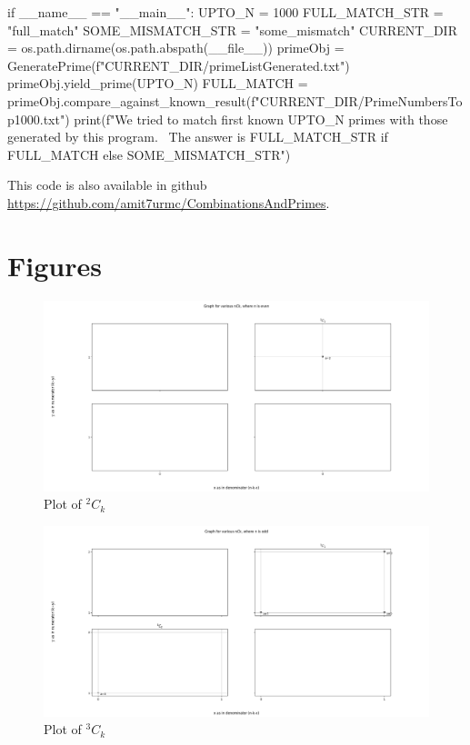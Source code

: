 \documentclass[10pt, twoside]{article}
\newcommand*{\Combination}[2]{{}^{#1}C_{#2}}%
\begin{document}
\begin{appendices}
\begin{python}
if __name__ == "__main__":
    UPTO_N = 1000
    FULL_MATCH_STR = "full_match"
    SOME_MISMATCH_STR = "some_mismatch"
    CURRENT_DIR = os.path.dirname(os.path.abspath(__file__))
    primeObj = GeneratePrime(f"{CURRENT_DIR}/primeListGenerated.txt")
    primeObj.yield_prime(UPTO_N)
    FULL_MATCH = primeObj.compare_against_known_result(f"{CURRENT_DIR}/PrimeNumbersTop1000.txt")
    print(f"We tried to match first known {UPTO_N} primes with those generated by this program. \
    The answer is {FULL_MATCH_STR if FULL_MATCH else SOME_MISMATCH_STR}")
	\end{python}	
	This code is also available in github \url{https://github.com/amit7urmc/CombinationsAndPrimes}.
\section{Figures}
\begin{figure}[ph!]
	\includegraphics[width=\linewidth]{2Ck.png}
	\caption{Plot of $\Combination{2}{k}$}
	\label{2Ck}
\end{figure}
\begin{figure}[ph!]	
	\includegraphics[width=\linewidth]{3Ck.png}
	\caption{Plot of $\Combination{3}{k}$}
	\label{3Ck}
\end{figure}
\begin{figure}[ph!]	

\end{figure}
\end{appendices}
\end{document}
